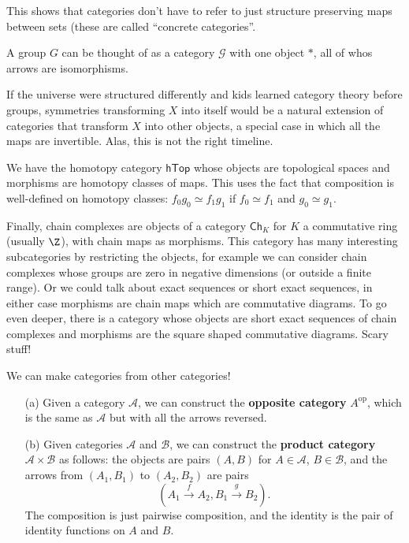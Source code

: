 This shows that categories don't have to refer to just structure preserving maps between sets (these are called ``concrete categories''.
\begin{example}
   A group $G $ can be thought of as a category $\mathcal{G} $ with one object $*$, all of whos arrows are isomorphisms. 

            If the universe were structured differently and kids learned category theory before groups, symmetries transforming $X$ into itself would be a natural extension of categories that transform $X$ into other objects, a special case in which all the maps are invertible. Alas, this is not the right timeline.
\end{example}

\begin{example}
    We have the homotopy category $\mathsf{hTop} $ whose objects are topological spaces and morphisms are homotopy classes of maps. This uses the fact that composition is well-defined on homotopy classes: $f_0g_0 \simeq f_1g_1$ if $f_0 \simeq f_1$ and $g_0 \simeq g_1$.
\end{example}

\begin{example}
    Finally, chain complexes are objects of a category $\mathsf{Ch} _K$ for $K$ a commutative ring (usually $\Z$), with chain maps as morphisms. This category has many interesting subcategories by restricting the objects, for example we can consider chain complexes whose groups are zero in negative dimensions (or outside a finite range). Or we could talk about exact sequences or short exact sequences, in either case morphisms are chain maps which are commutative diagrams. To go even deeper, there is a category whose objects are short exact sequences of chain complexes and morphisms are the square shaped commutative diagrams. Scary stuff!
\end{example}
\begin{example}
We can make categories from other categories!
   \begin{enumerate}
       \item[(a)] Given a category $\mathcal{A} $, we can construct the \textbf{opposite category} $A^{\text{op}}$, which is the same as $\mathcal{A} $ but with all the arrows reversed.
       \item[(b)] Given categories $\mathcal{A} $ and $\mathcal{B} $, we can construct the \textbf{product category}  $\mathcal{A} \times \mathcal{B} $ as follows: the objects are pairs $(A,B)$ for $A\in \mathcal{A} $, $B\in \mathcal{B} $, and the arrows from $(A_1,B_1)$ to $(A_2,B_2)$ are pairs \[
               \left( A_1 \overset{f}{\to }A_2, B_1\overset{g}{\to }B_2 \right) .
       \] The composition is just pairwise composition, and the identity is the pair of identity functions on $A$ and $B$.
   \end{enumerate} 
\end{example}

